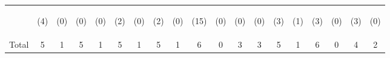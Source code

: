 \begin{tabular}{lcccccccccccccccccc}
 & \begin{footnotesize}(4)\end{footnotesize} & \begin{footnotesize}(0)\end{footnotesize} & \begin{footnotesize}(0)\end{footnotesize} & \begin{footnotesize}(0)\end{footnotesize} & \begin{footnotesize}(2)\end{footnotesize} & \begin{footnotesize}(0)\end{footnotesize} & \begin{footnotesize}(2)\end{footnotesize} & \begin{footnotesize}(0)\end{footnotesize} & \begin{footnotesize}(15)\end{footnotesize} & \begin{footnotesize}(0)\end{footnotesize} & \begin{footnotesize}(0)\end{footnotesize} & \begin{footnotesize}(0)\end{footnotesize} & \begin{footnotesize}(3)\end{footnotesize} & \begin{footnotesize}(1)\end{footnotesize} & \begin{footnotesize}(3)\end{footnotesize} & \begin{footnotesize}(0)\end{footnotesize} & \begin{footnotesize}(3)\end{footnotesize} & \begin{footnotesize}(0)\end{footnotesize}\\
\noalign{\smallskip}Total & 5 & 1 & 5 & 1 & 5 & 1 & 5 & 1 & 6 & 0 & 3 & 3 & 5 & 1 & 6 & 0 & 4 & 2\\

\end{tabular}
